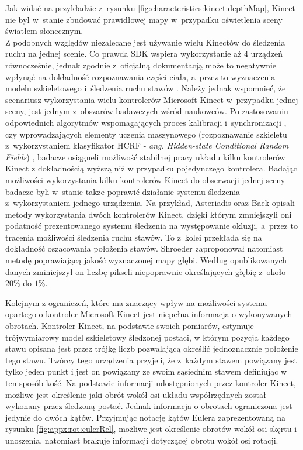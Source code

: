 																																			
Jak widać na przykładzie z~rysunku \ref{fig:characteristics:kinect:depthMap}, Kinect nie był w~stanie zbudować prawidłowej mapy w~przypadku oświetlenia sceny światłem słonecznym. \\
Z podobnych względów niezalecane jest używanie wielu Kinectów do śledzenia ruchu na jednej scenie. Co prawda SDK wspiera wykorzystanie aż 4 urządzeń równocześnie, jednak zgodnie z~oficjalną dokumentacją może to negatywnie wpłynąć na dokładność rozpoznawania części ciała, a~przez to wyznaczenia modelu szkieletowego i~śledzenia ruchu stawów . Należy jednak wspomnieć, że scenariusz wykorzystania wielu kontrolerów Microsoft Kinect w~przypadku jednej sceny, jest jednym z~obszarów badawczych wśród naukowców. Po zastosowaniu odpowiednich algorytmów wspomagających proces kalibracji i~synchronizacji \cite{Kohno2013}, czy wprowadzających elementy uczenia maszynowego (rozpoznawanie szkieletu z~wykorzystaniem klasyfikator HCRF - \emph{ang. Hidden-state Conditional Random Fields}) \cite{Kitsikidis2011}, badacze osiągneli możliwość stabilnej pracy układu kilku kontrolerów Kinect z dokładnością wyższą niż w przypadku pojedynczego kontrolera. Badając możliwości wykorzystania kilku kontrolerów Kinect do obserwacji jednej sceny badacze byli w~stanie także poprawić działanie systemu śledzenia z~wykorzystaniem jednego urządzenia. Na przykład, Asteriadis \cite{Asteriadis2013} oraz Baek \cite{Baek2014} opisali metody wykorzystania dwóch kontrolerów Kinect, dzięki którym zmniejszyli oni podatność prezentowanego systemu śledzenia na występowanie okluzji, a~przez to tracenia możliwości śledzenia ruchu stawów. To z~kolei przekłada się na dokładność oszacowania położenia stawów. Shroeder \cite{Schroder2011} zaproponował natomiast metodę poprawiającą jakość wyznaczonej mapy głębi. Według opublikowanych danych zminiejszył on liczbę pikseli niepoprawnie określających głębię z~około $20\%$ do $1\%$.

Kolejnym z ograniczeń, które ma znaczący wpływ na możliwości systemu opartego o kontroler Microsoft Kinect jest niepełna informacja o wykonywanych obrotach. Kontroler Kinect, na podstawie swoich pomiarów, estymuje trójwymiarowy model szkieletowy śledzonej postaci, w którym pozycja każdego stawu opisana jest przez trójkę liczb pozwalającą określić jednoznacznie położenie tego stawu. Twórcy tego urządzenia przyjeli, że z~każdym stawem powiązany jest tylko jeden punkt i jest on powiązany ze swoim sąsiednim stawem definiując w ten sposób kość. Na podstawie informacji udostępnionych przez kontroler Kinect, możliwe jest określenie jaki obrót wokół osi układu współrzędnych został wykonany przez śledzoną postać. Jednak informacja o obrotach ograniczona jest jedynie do dwóch kątów. Przyjmując notację kątów Eulera zaprezentowaną na rysunku 	\ref{fig:appx:rot:eulerRel}, możliwe jest określenie obrotów wokół osi skęrtu i unoszenia, natomiast brakuje informacji dotyczącej obrotu wokół osi rotacji.

